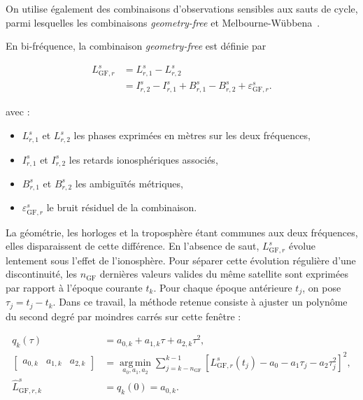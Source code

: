 On utilise également des combinaisons d'observations sensibles aux sauts de
cycle, parmi lesquelles les combinaisons \textit{geometry-free} et
Melbourne-Wübbena~\cite{blewitt1990,melbourne1985,wubbena1985}.

En bi-fréquence, la combinaison \textit{geometry-free} est définie par

\begin{align}
L_{\mathrm{GF},r}^s
&=
L_{r,1}^s-L_{r,2}^s
\\
&=
I_{r,2}^s-I_{r,1}^s
+B_{r,1}^s-B_{r,2}^s
+\varepsilon_{\mathrm{GF},r}^s.
\label{ppp:eq:geometry_free_slip}
\end{align}

avec :

\begin{itemize}
    \item $L_{r,1}^s$ et $L_{r,2}^s$ les phases exprimées en mètres sur les
    deux fréquences,
    \item $I_{r,1}^s$ et $I_{r,2}^s$ les retards ionosphériques associés,
    \item $B_{r,1}^s$ et $B_{r,2}^s$ les ambiguïtés métriques,
    \item $\varepsilon_{\mathrm{GF},r}^s$ le bruit résiduel de la combinaison.
\end{itemize}

La géométrie, les horloges et la troposphère étant communes aux deux
fréquences, elles disparaissent de cette différence. En l'absence de saut,
$L_{\mathrm{GF},r}^s$ évolue lentement sous l'effet de l'ionosphère. Pour
séparer cette évolution régulière d'une discontinuité, les $n_{\mathrm{GF}}$
dernières valeurs valides du même satellite sont exprimées par rapport à
l'époque courante $t_k$. Pour chaque époque antérieure $t_j$, on pose
$\tau_j=t_j-t_k$. Dans ce travail, la méthode retenue consiste à ajuster un
polynôme du second degré par moindres
carrés sur cette fenêtre :

\begin{align}
q_k(\tau)
&=
a_{0,k}+a_{1,k}\tau+a_{2,k}\tau^2,
\\
\begin{bmatrix}
a_{0,k} & a_{1,k} & a_{2,k}
\end{bmatrix}
&=
\underset{a_0,a_1,a_2}{\operatorname{arg\,min}}
\sum_{j=k-n_{\mathrm{GF}}}^{k-1}
\left[
L_{\mathrm{GF},r}^s(t_j)
-a_0-a_1\tau_j-a_2\tau_j^2
\right]^2,
\\
\widehat L_{\mathrm{GF},r,k}^s
&=
q_k(0)=a_{0,k}.
\label{ppp:eq:geometry_free_prediction}
\end{align}

